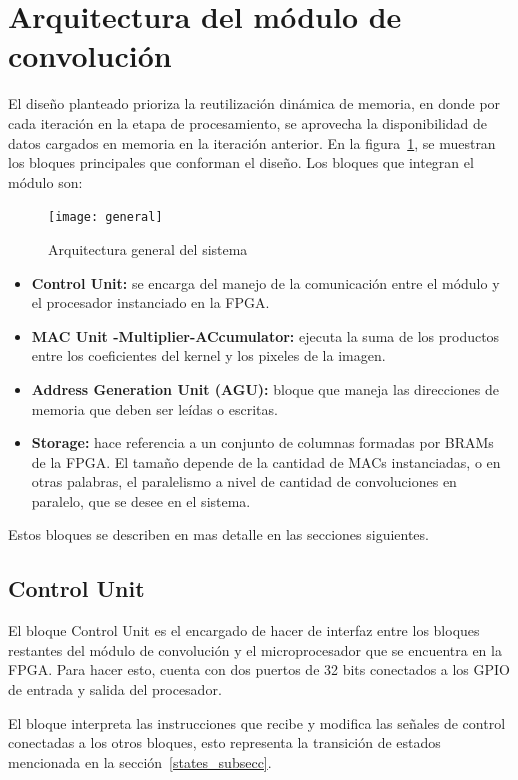\section{Arquitectura del módulo de convolución}  \label{ourdesign_subsecs}

El diseño planteado prioriza la reutilización dinámica de memoria, en donde por
cada iteración en la etapa de procesamiento, se aprovecha la disponibilidad de
datos cargados en memoria en la iteración anterior.
En la figura~\ref{general}, se muestran los bloques principales que conforman el
diseño. Los bloques que integran el módulo son:

\begin{figure}
\centering
\texttt{[image: general]}
\caption{Arquitectura general del sistema }
\label{general}
\end{figure}

\begin{itemize}
\item \textbf{Control Unit:} se encarga del manejo de la comunicación entre el
  módulo y el procesador instanciado en la FPGA.
\item \textbf{MAC Unit -Multiplier-ACcumulator:} ejecuta la suma de los productos entre los coeficientes del kernel y los pixeles de la imagen. 
\item \textbf{Address Generation Unit (AGU):} bloque que maneja las direcciones
  de memoria que deben ser leídas o escritas.
\item \textbf{Storage:} hace referencia a un conjunto de columnas formadas por
  BRAMs de la FPGA. El tamaño depende de la cantidad de MACs instanciadas,
  o en otras palabras, el paralelismo a nivel de cantidad de convoluciones en
  paralelo, que se desee en el sistema.
\end{itemize}
     
Estos bloques se describen en mas detalle en las secciones siguientes.

\subsection{Control Unit}\label{sec:ctrl_u}
El bloque Control Unit es el encargado de hacer de interfaz entre los bloques
restantes del módulo de convolución y el microprocesador que se encuentra en la
FPGA. Para hacer esto, cuenta con dos puertos de 32 bits conectados a los GPIO
de entrada y salida del procesador.

El bloque interpreta las instrucciones que recibe y modifica las señales de
control conectadas a los otros bloques, esto representa la transición de
estados mencionada en la sección~\ref{states_subsecc}.

